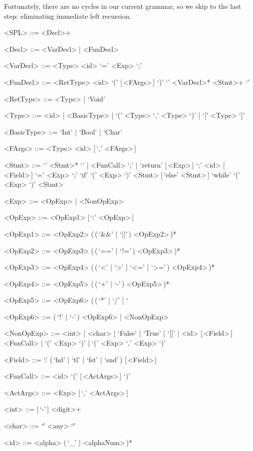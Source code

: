 \documentclass{article}
\begin{document}
Fortunately, there are no cycles in our current grammar, so we skip to the last step: eliminating immediate left recursion.
\begin{grammar}
    <SPL> ::= <Decl>+

    <Decl> ::= <VarDecl> | <FunDecl>

    <VarDecl> ::= <Type> <id> `=' <Exp> `;'

    <FunDecl> ::= <RetType> <id> `(' [\,<FArgs>\,] `)' `{' <VarDecl>* <Stmt>+ `}'

    <RetType> ::= <Type> | `Void'

    <Type> ::= <id> | <BasicType> | `(' <Type> `,' <Type> `)' | `[' <Type> `]'

    <BasicType> ::= `Int' | `Bool' | `Char'

    <FArgs> ::= <Type> <id> [\,`,' <FArgs>\,]

    <Stmt> ::= `{' <Stmt>* `}' | <FunCall> `;' | `return' [\,<Exp>\,] `;'
    \alt <id> [\,<Field>\,] `=' <Exp> `;'
    \alt `if' `(' <Exp> `)' <Stmt> [\,`else' <Stmt>\,]
    \alt `while' `(' <Exp> `)' <Stmt>

    <Exp> ::= <OpExp> | <NonOpExp>

    <OpExp> ::= <OpExp1> [\,`:' <OpExp>\,]

    <OpExp1> ::= <OpExp2> (\,(\,`&&' | `||'\,) <OpExp2>\,)*

    <OpExp2> ::= <OpExp3> (\,(\,`==' | `!='\,) <OpExp3>\,)*

    <OpExp3> ::= <OpExp4> (\,(\,`<' | `>' | `<=' | `>='\,) <OpExp4>\,)*

    <OpExp4> ::= <OpExp5> (\,(\,`+' | `-'\,) <OpExp5>\,)*

    <OpExp5> ::= <OpExp6> (\,(\,`*' | `/' | `%

    <OpExp6> ::= (\,`!' | `-'\,) <OpExp6> | <NonOpExp>

    <NonOpExp> ::= <int> | <char> | `False' | `True' | `[]' | <id> [\,<Field>\,]
    \alt <FunCall> | `(' <Exp> `)' | `(' <Exp> `,' <Exp> `)'

    <Field> ::= `.' (\,`hd' | `tl' | `fst' | `snd'\,) [\,<Field>\,]

    <FunCall> ::= <id> `(' [\,<ActArgs>\,] `)'

    <ActArgs> ::= <Exp> [\,`,' <ActArgs>\,]

    <int> ::= [\,`-'\,] <digit>+

    <char> ::= `\'' <any> `\''

    <id> ::= <alpha> (\,`_' | <alphaNum>\,)*
\end{grammar}
\end{document}
